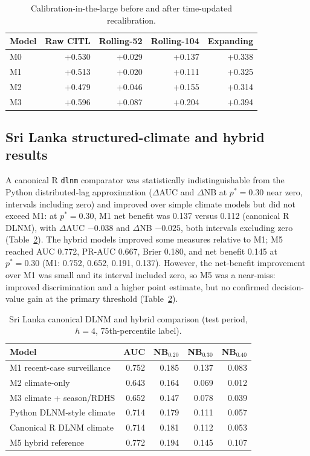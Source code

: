 \documentclass[11pt,a4paper]{article}
\begin{document}
\begin{table}[htbp]
\centering
\caption{Calibration-in-the-large before and after time-updated recalibration.}
\label{tab:recal}
\small
\begin{tabular}{lrrrr}
\toprule
Model & Raw CITL & Rolling-52 & Rolling-104 & Expanding \\
\midrule
M0 & +0.530 & +0.029 & +0.137 & +0.338 \\
M1 & +0.513 & +0.020 & +0.111 & +0.325 \\
M2 & +0.479 & +0.046 & +0.155 & +0.314 \\
M3 & +0.596 & +0.087 & +0.204 & +0.394 \\
\bottomrule
\end{tabular}
\end{table}

\subsection{Sri Lanka structured-climate and hybrid results}
A canonical R \texttt{dlnm} comparator was statistically indistinguishable from the Python distributed-lag approximation ($\Delta$AUC and $\Delta$NB at $p^*=0.30$ near zero, intervals including zero) and improved over simple climate models but did not exceed M1: at $p^*=0.30$, M1 net benefit was 0.137 versus 0.112 (canonical R DLNM), with $\Delta$AUC $-0.038$ and $\Delta$NB $-0.025$, both intervals excluding zero (Table~\ref{tab:dlnmhybrid}). The hybrid models improved some measures relative to M1; M5 reached AUC 0.772, PR-AUC 0.667, Brier 0.180, and net benefit 0.145 at $p^*=0.30$ (M1: 0.752, 0.652, 0.191, 0.137). However, the net-benefit improvement over M1 was small and its interval included zero, so M5 was a near-miss: improved discrimination and a higher point estimate, but no confirmed decision-value gain at the primary threshold (Table~\ref{tab:dlnmhybrid}).

\begin{table}[htbp]
\centering
\caption{Sri Lanka canonical DLNM and hybrid comparison (test period, $h=4$, 75th-percentile label).}
\label{tab:dlnmhybrid}
\small
\begin{tabular}{lrrrr}
\toprule
Model & AUC & NB$_{0.20}$ & NB$_{0.30}$ & NB$_{0.40}$ \\
\midrule
M1 recent-case surveillance & 0.752 & 0.185 & 0.137 & 0.083 \\
M2 climate-only & 0.643 & 0.164 & 0.069 & 0.012 \\
M3 climate + season/RDHS & 0.652 & 0.147 & 0.078 & 0.039 \\
Python DLNM-style climate & 0.714 & 0.179 & 0.111 & 0.057 \\
Canonical R DLNM climate & 0.714 & 0.181 & 0.112 & 0.053 \\
M5 hybrid reference & 0.772 & 0.194 & 0.145 & 0.107 \\
\bottomrule
\end{tabular}
\end{table}
\end{document}
